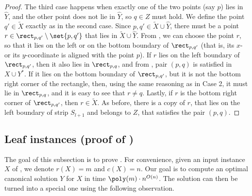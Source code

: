 \begin{proof}
The third case happens when exactly one of the two points (say $p$) lies in $\hat Y$, and the other point does not lie in $\hat Y$, so $q\in Z$ must hold. We define  the point $q'\in \widetilde{X}$ exactly as in the second case. Since $p,q'\in \widetilde{X}\cup \hat Y$, there must be a point $r\in \rect_{p,q'}\setminus\set{p,q'}$ that lies in $\widetilde{X}\cup \hat Y$. From , we can choose the point $r$, so that it lies on the left or on the bottom boundary of $\rect_{p,q'}$ (that is, its $x$- or its $y$-coordinate is aligned with the point $p$). If $r$ lies on the left boundary of $\rect_{p,q'}$, then it also lies in $\rect_{p,q}$, and from , pair $(p,q)$ is satisfied in $X\cup Y^*$. If it lies on the bottom boundary of $\rect_{p,q'}$, but it is not the bottom right corner of the rectangle, then, using the same reasoning as in Case 2, it must lie in $\rect_{p,q}$, and it is easy to see that $r\neq q$. Lastly, if $r$ is the bottom right corner of $\rect_{p,q'}$, then $r\in \widetilde{X}$. As before, there is a copy of $r$, that lies on the left boundary of strip $S_{l+1}$ and belongs to $Z$, that satisfies the pair $(p,q)$. 
\end{proof}

\subsection{Leaf instances (proof of )}
\label{sec: leaf problem}


The goal of this subsection is to prove . For convenience, given an input instance $X$ of \minsat, we denote $r(X)=m$ and $c(X)=n$. Our goal is to compute an optimal canonical solution $Y$ for $X$ in time $\poly(m)\cdot n^{O(n)}$. The solution can then be turned into a special one using the following observation. 



